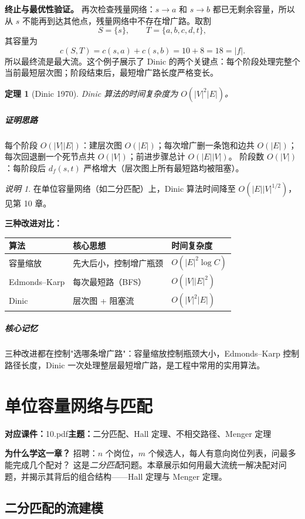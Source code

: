 \documentclass[UTF8,openany,12pt]{ctexbook}
\newtheorem{theorem}{定理}[chapter]
\theoremstyle{remark}
\newtheorem{remark}{说明}[chapter]
\newcommand{\lecture}[3]{
  \chapter{#2}
  \noindent\textbf{对应课件：}#1\hfill\textbf{主题：}#3
  \vspace{0.6em}
}
\newcommand{\keypoint}[1]{\paragraph{核心记忆}#1}
\newcommand{\proofidea}[1]{\paragraph{证明思路}#1}
\begin{document}
\medskip
\noindent\textbf{终止与最优性验证。}
再次检查残量网络：$s\to a$ 和 $s\to b$ 都已无剩余容量，所以从 $s$ 不能再到达其他点，残量网络中不存在增广路。取割
\[
  S=\{s\},\qquad T=\{a,b,c,d,t\},
\]
其容量为
\[
  c(S,T)=c(s,a)+c(s,b)=10+8=18=|f|.
\]
所以最终流是最大流。这个例子展示了 Dinic 的两个关键点：每个阶段处理完整个当前最短层次图；阶段结束后，最短增广路长度严格变长。

\begin{theorem}[Dinic 1970]
Dinic 算法的时间复杂度为 $O(|V|^2|E|)$。
\end{theorem}
\proofidea{
每个阶段 $O(|V||E|)$：建层次图 $O(|E|)$；每次增广删一条饱和边共 $O(|E|)$；每次回退删一个死节点共 $O(|V|)$；前进步骤总计 $O(|E||V|)$。
阶段数 $O(|V|)$：每阶段后 $d_f(s,t)$ 严格增大（层次图上所有最短路均被阻塞）。
}

\begin{remark}
在单位容量网络（如二分匹配）上，Dinic 算法时间降至 $O(|E||V|^{1/2})$，见第 10 章。
\end{remark}

\noindent\textbf{三种改进对比：}

\begin{center}
\begin{tabular}{lll}
\toprule
算法 & 核心思想 & 时间复杂度 \\
\midrule
容量缩放 & 先大后小，控制增广瓶颈 & $O(|E|^2\log C)$ \\
Edmonds--Karp & 每次最短路（BFS）& $O(|V||E|^2)$ \\
Dinic & 层次图 + 阻塞流 & $O(|V|^2|E|)$ \\
\bottomrule
\end{tabular}
\end{center}

\keypoint{三种改进都在控制"选哪条增广路"：容量缩放控制瓶颈大小，Edmonds--Karp 控制路径长度，Dinic 一次处理整层最短增广路，是工程中常用的实用算法。}


\lecture{10.pdf}{单位容量网络与匹配}{二分匹配、Hall 定理、不相交路径、Menger 定理}

\noindent
\textbf{为什么学这一章？}
招聘：$n$ 个岗位，$m$ 个候选人，每人有意向岗位列表，问最多能完成几个配对？
这是\emph{二分匹配}问题。本章展示如何用最大流统一解决配对问题，并揭示其背后的组合结构——Hall 定理与 Menger 定理。

\section{二分匹配的流建模}
\end{document}
